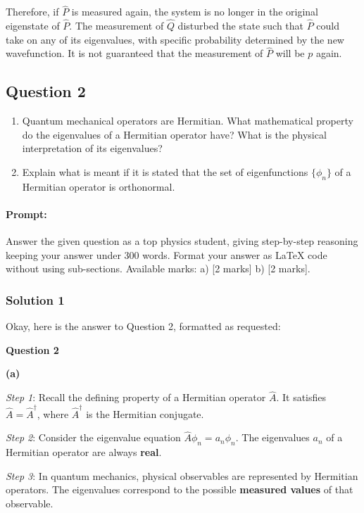 \documentclass{article}
\begin{document}
Therefore, if $\hat{P}$ is measured again, the system is no longer in the original eigenstate of $\hat{P}$. The measurement of $\hat{Q}$ disturbed the state such that $\hat{P}$ could take on any of its eigenvalues, with specific probability determined by the new wavefunction. It is not guaranteed that the measurement of $\hat{P}$ will be $p$ again.


\subsection{Question 2}

\begin{enumerate}
    \item[(a)] Quantum mechanical operators are Hermitian. What mathematical property do the eigenvalues of a Hermitian operator have? What is the physical interpretation of its eigenvalues?
    \item[(b)] Explain what is meant if it is stated that the set of eigenfunctions $\{\phi_n\}$ of a Hermitian operator is orthonormal.
\end{enumerate}


\paragraph{Prompt: \\} 
Answer the given question as a top physics student, giving step-by-step reasoning keeping your answer under 300 words. Format your answer as LaTeX code without using sub-sections. Available marks: a) [2 marks] b) [2 marks].

\subsubsection{Solution 1}
Okay, here is the answer to Question 2, formatted as requested:

\textbf{Question 2}

\textbf{(a)}

\textit{Step 1}: Recall the defining property of a Hermitian operator $\hat{A}$. It satisfies $\hat{A} = \hat{A}^\dagger$, where $\hat{A}^\dagger$ is the Hermitian conjugate.

\textit{Step 2}: Consider the eigenvalue equation $\hat{A}\phi_n = a_n\phi_n$. The eigenvalues $a_n$ of a Hermitian operator are always \textbf{real}.

\textit{Step 3}: In quantum mechanics, physical observables are represented by Hermitian operators. The eigenvalues correspond to the possible \textbf{measured values} of that observable.
\end{document}
